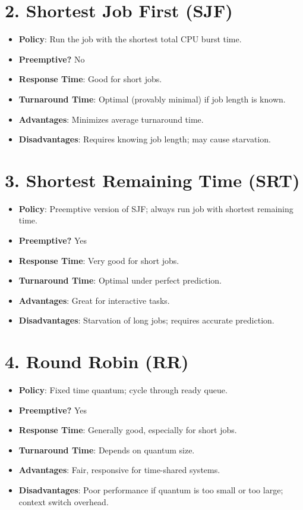 \documentclass[12pt]{article}
\begin{document}
\section*{2. Shortest Job First (SJF)}

\begin{itemize}
    \item \textbf{Policy}: Run the job with the shortest total CPU burst time.
    \item \textbf{Preemptive?} No
    \item \textbf{Response Time}: Good for short jobs.
    \item \textbf{Turnaround Time}: Optimal (provably minimal) if job length is known.
    \item \textbf{Advantages}: Minimizes average turnaround time.
    \item \textbf{Disadvantages}: Requires knowing job length; may cause starvation.
\end{itemize}

\section*{3. Shortest Remaining Time (SRT)}

\begin{itemize}
    \item \textbf{Policy}: Preemptive version of SJF; always run job with shortest remaining time.
    \item \textbf{Preemptive?} Yes
    \item \textbf{Response Time}: Very good for short jobs.
    \item \textbf{Turnaround Time}: Optimal under perfect prediction.
    \item \textbf{Advantages}: Great for interactive tasks.
    \item \textbf{Disadvantages}: Starvation of long jobs; requires accurate prediction.
\end{itemize}

\section*{4. Round Robin (RR)}

\begin{itemize}
    \item \textbf{Policy}: Fixed time quantum; cycle through ready queue.
    \item \textbf{Preemptive?} Yes
    \item \textbf{Response Time}: Generally good, especially for short jobs.
    \item \textbf{Turnaround Time}: Depends on quantum size.
    \item \textbf{Advantages}: Fair, responsive for time-shared systems.
    \item \textbf{Disadvantages}: Poor performance if quantum is too small or too large; context switch overhead.
\end{itemize}
\end{document}
